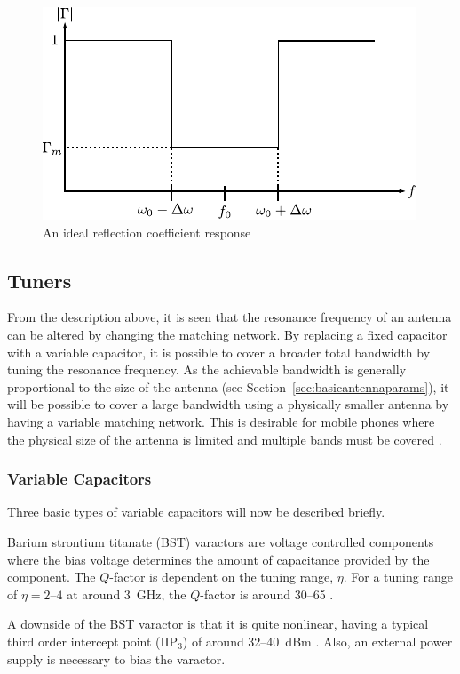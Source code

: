\begin{figure}[htbp]
    \centering
    \includegraphics{img/analysis/ideal_reflecResponse}
    \caption{An ideal reflection coefficient response \cite{AntennaswithNonFosterMatchingNetworks}}
    \label{fig:idealReflec}
\end{figure}

\subsection{Tuners}
From the description above, it is seen that the resonance frequency of an antenna can be altered by changing the matching network. By replacing a fixed capacitor with a variable capacitor, it is possible to cover a broader total bandwidth by tuning the resonance frequency. As the achievable bandwidth is generally proportional to the size of the antenna (see Section~\ref{sec:basicantennaparams}), it will be possible to cover a large bandwidth using a physically smaller antenna by having a variable matching network. This is desirable for mobile phones where the physical size of the antenna is limited and multiple bands must be covered \cite{gu2014rf}.

\subsubsection{Variable Capacitors}
Three basic types of variable capacitors will now be described briefly. 

Barium strontium titanate (BST) varactors are voltage controlled components where the bias voltage determines the amount of capacitance provided by the component. The $Q$-factor is dependent on the tuning range, $\eta$. For a tuning range of $\eta = 2$--$4$ at around \SI{3}{GHz}, the $Q$-factor is around 30--65 \cite{gu2014rf}. 

A downside of the BST varactor is that it is quite nonlinear, having a typical third order intercept point ($\text{IIP}_3$) of around 32--\SI{40}{dBm} \cite{gu2014rf}. Also, an external power supply is necessary to bias the varactor.

